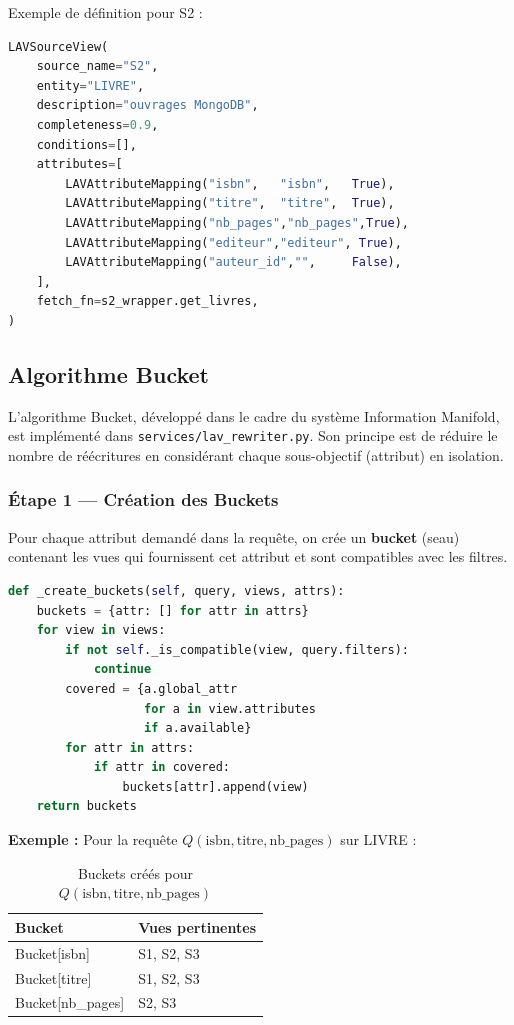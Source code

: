 \documentclass[12pt,a4paper]{article}
\begin{document}
Exemple de définition pour S2 :
\begin{lstlisting}[language=Python, caption=Vue LAV de S2 pour LIVRE]
LAVSourceView(
    source_name="S2",
    entity="LIVRE",
    description="ouvrages MongoDB",
    completeness=0.9,
    conditions=[],
    attributes=[
        LAVAttributeMapping("isbn",   "isbn",   True),
        LAVAttributeMapping("titre",  "titre",  True),
        LAVAttributeMapping("nb_pages","nb_pages",True),
        LAVAttributeMapping("editeur","editeur", True),
        LAVAttributeMapping("auteur_id","",     False),
    ],
    fetch_fn=s2_wrapper.get_livres,
)
\end{lstlisting}

\subsection{Algorithme Bucket}

L'algorithme Bucket, développé dans le cadre du système Information Manifold, est implémenté dans \texttt{services/lav\_rewriter.py}. Son principe est de réduire le nombre de réécritures en considérant chaque sous-objectif (attribut) en isolation.

\subsubsection{Étape 1 — Création des Buckets}
Pour chaque attribut demandé dans la requête, on crée un \textbf{bucket} (seau) contenant les vues qui fournissent cet attribut et sont compatibles avec les filtres.

\begin{lstlisting}[language=Python, caption=Création des Buckets]
def _create_buckets(self, query, views, attrs):
    buckets = {attr: [] for attr in attrs}
    for view in views:
        if not self._is_compatible(view, query.filters):
            continue
        covered = {a.global_attr
                   for a in view.attributes
                   if a.available}
        for attr in attrs:
            if attr in covered:
                buckets[attr].append(view)
    return buckets
\end{lstlisting}

\textbf{Exemple :} Pour la requête $Q(\text{isbn}, \text{titre}, \text{nb\_pages})$ sur LIVRE :

\begin{table}[H]
\centering
\begin{tabular}{ll}
\toprule
\textbf{Bucket} & \textbf{Vues pertinentes} \\
\midrule
Bucket[isbn] & S1, S2, S3 \\
Bucket[titre] & S1, S2, S3 \\
Bucket[nb\_pages] & S2, S3 \\
\bottomrule
\end{tabular}
\caption{Buckets créés pour $Q(\text{isbn}, \text{titre}, \text{nb\_pages})$}
\end{table}
\end{document}
